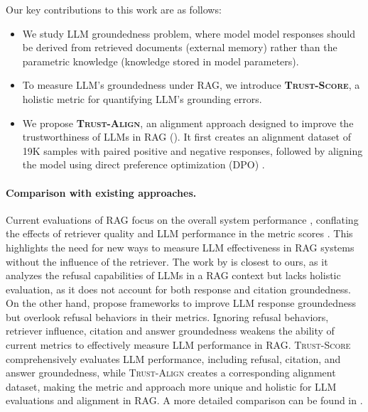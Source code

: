 \documentclass{article} %
\newcommand{\method}[0]{\textsc{Trust-Align}}
\newcommand{\metric}[0]{\textsc{Trust-Score}}
\begin{document}
Our key contributions to this work are as follows:

\begin{itemize}[leftmargin=*, topsep=0pt]
\item We study LLM groundedness problem, where model model responses should be derived from retrieved documents (external memory) rather than the parametric knowledge (knowledge stored in model parameters).

\item To measure LLM's groundedness under RAG, we introduce \textbf{\metric{}}, a holistic metric for quantifying LLM's grounding errors. 

\item We propose \textbf{\method{}}, an alignment approach designed to improve the trustworthiness of LLMs in RAG (). It first creates an alignment dataset of 19K samples with paired positive and negative responses, followed by aligning the model using direct preference optimization (DPO) \citep{rafailov2024direct}.
\end{itemize}

\paragraph{Comparison with existing approaches.} 
Current evaluations of RAG focus on the overall system performance \citep{gao2023enabling, xu2024aliiceevaluatingpositionalfinegrained}, conflating the effects of retriever quality and LLM performance in the metric scores \citep{fan2024survey}. This highlights the need for new ways to measure LLM effectiveness in RAG systems without the influence of the retriever. The work by \citet{thakur2024nomiraclknowingdontknow} is closest to ours, as it analyzes the refusal capabilities of LLMs in a RAG context but lacks holistic evaluation, as it does not account for both response and citation groundedness. On the other hand, \citet{ye2024effective, hsu2024calmcontrastinglargesmall, huang-etal-2024-learning} propose frameworks to improve LLM response groundedness but overlook refusal behaviors in their metrics. Ignoring refusal behaviors, retriever influence, citation and answer groundedness weakens the ability of current metrics to effectively measure LLM performance in RAG. \metric{} comprehensively evaluates LLM performance, including refusal, citation, and answer groundedness, while \method{} creates a corresponding alignment dataset, making the metric and approach more unique and holistic for LLM evaluations and alignment in RAG. A more detailed comparison can be found in .
\end{document}
